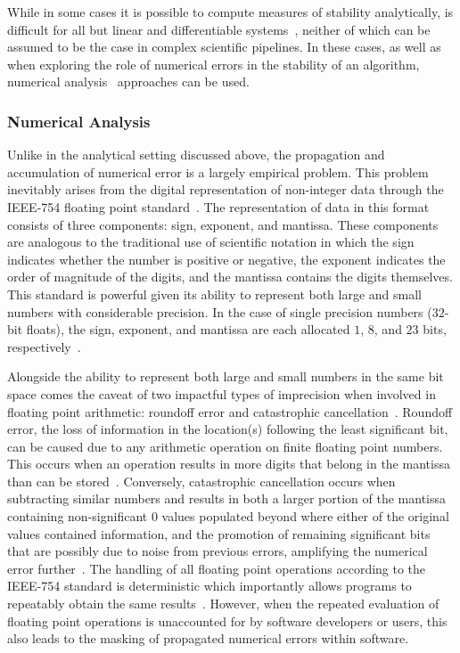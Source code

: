 While in some cases it is possible to compute measures of stability analytically, is difficult for all but linear and
differentiable systems~\cite{kiusalaas2013numerical}, neither of which can be assumed to be the case in complex
scientific pipelines. In these cases, as well as when exploring the role of numerical errors in the stability of an
algorithm, numerical analysis~\cite{hildebrand1987introduction} approaches can be used.

\subsubsection{Numerical Analysis}
Unlike in the analytical setting discussed above, the propagation and accumulation of numerical error is a largely
empirical problem. This problem inevitably arises from the digital representation of non-integer data through the
IEEE-754 floating point standard~\cite{ieee754}. The representation of data in this format consists of three
components: sign, exponent, and mantissa. These components are analogous to the traditional use of scientific notation
in which the sign indicates whether the number is positive or negative, the exponent indicates the order of magnitude
of the digits, and the mantissa contains the digits themselves. This standard is powerful given its ability to
represent both large and small numbers with considerable precision. In the case of single precision numbers ($32$-bit
floats), the sign, exponent, and mantissa are each allocated $1$, $8$, and $23$ bits, respectively~\cite{ieee754}.

Alongside the ability to represent both large and small numbers in the same bit space comes the caveat of two impactful
types of imprecision when involved in floating point arithmetic: roundoff error and catastrophic
cancellation~\cite{muller2018handbook}. Roundoff error, the loss of information in the location(s) following the least
significant bit, can be caused due to any arithmetic operation on finite floating point numbers. This occurs when an
operation results in more digits that belong in the mantissa than can be stored~\cite{muller2018handbook}. Conversely,
catastrophic cancellation occurs when subtracting similar numbers and results in both a larger portion of the mantissa
containing non-significant $0$ values populated beyond where either of the original values contained information, and
the promotion of remaining significant bits that are possibly due to noise from previous errors, amplifying the
numerical error further~\cite{muller2018handbook}. The handling of all floating point operations according to the
IEEE-754 standard is deterministic which importantly allows programs to repeatably obtain the same
results~\cite{ieee754}. However, when the repeated evaluation of floating point operations is unaccounted for by
software developers or users, this also leads to the masking of propagated numerical errors within software.

